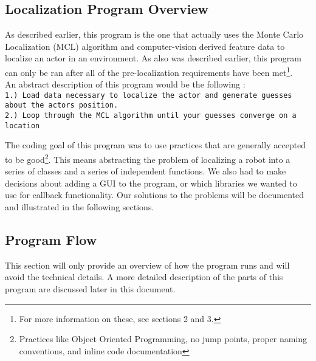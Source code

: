 \documentclass[a4paper,11pt]{article}
\begin{document}
  \subsection{Localization Program Overview}
  As described earlier, this program is the one that actually uses the Monte Carlo Localization (MCL) algorithm and computer-vision derived feature data to localize an actor in an environment.
  As also was described earlier, this program can only be ran after all of the pre-localization requirements have been met\footnote{For more information on these, see sections 2 and 3.}.
  \\ An abstract description of this program would be the following :
  \\ \texttt{1.) Load data necessary to localize the actor and generate guesses about the actors position.} 
  \\ \texttt{2.) Loop through the MCL algorithm until your guesses converge on a location}

  The coding goal of this program was to use practices that are generally accepted to be good\footnote{Practices like Object Oriented Programming, no jump points, proper naming conventions, and inline code documentation}.
  This means abstracting the problem of localizing a robot into a series of classes and a series of independent functions. We also had to make decisions about adding a GUI
  to the program, or which libraries we wanted to use for callback functionality. Our solutions to the problems will be documented and illustrated in the following sections.
  
  \subsection{Program Flow}
  This section will only provide an overview of how the program runs and will avoid the technical details. A more detailed description of the parts of this program are discussed later in this document.
  
\end{document}
